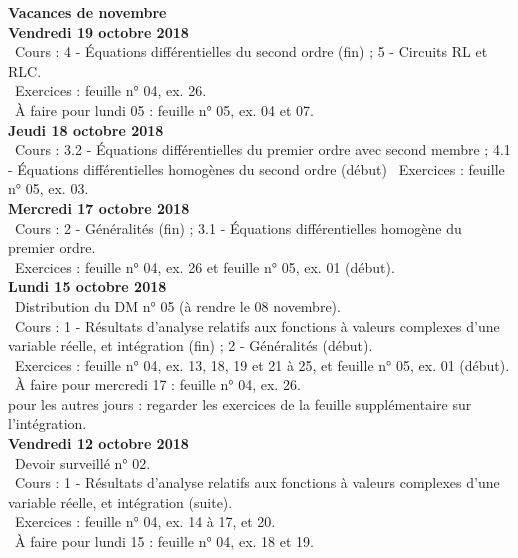 \documentclass[12pt,a4paper]{article}
\begin{document}
\noindent\textbf{ Vacances de novembre }\vspace{.4cm}\\

\noindent\textbf{Vendredi 19 octobre 2018}\\
\bu\ Cours : 4 - Équations différentielles du second ordre (fin) ; 5 - Circuits RL et RLC.\\
\bu\ Exercices : feuille n° 04, ex. 26.\\
\bu\ À faire pour lundi 05 : feuille n° 05, ex. 04 et 07.\vspace{.4cm}\\

\noindent\textbf{Jeudi 18 octobre 2018}\\
\bu\ Cours : 3.2 - Équations différentielles du premier ordre avec second membre ; 4.1 - Équations 
différentielles homogènes du second ordre (début)
\bu\ Exercices : feuille n° 05, ex. 03.\vspace{.4cm}\\
 
\noindent\textbf{\bf Mercredi 17 octobre 2018}\\
\bu\ Cours : 2 - Généralités (fin) ; 3.1 - Équations différentielles homogène du premier ordre.\\
\bu\ Exercices : feuille n° 04, ex. 26 et feuille n° 05, ex. 01 (début).\vspace{.4cm}\\
 
\noindent\textbf{Lundi 15 octobre 2018}\\
\bu\ Distribution du DM n° 05 (à rendre le 08 novembre).\\
\bu\ Cours : 1 - Résultats d'analyse relatifs aux fonctions à valeurs complexes d'une variable réelle, et intégration 
(fin) ; 2 - Généralités (début).\\
\bu\ Exercices : feuille n° 04, ex. 13, 18, 19 et 21 à 25, et feuille n° 05, ex. 01 (début).\\
\bu\ À faire pour mercredi 17 : feuille n° 04, ex. 26.\\
\bu pour les autres jours : regarder les exercices de la feuille supplémentaire sur l'intégration.\vspace{.4cm}\\
 
\noindent\textbf{Vendredi 12 octobre 2018}\\
\bu\ Devoir surveillé n° 02.\\
\bu\ Cours : 1 - Résultats d'analyse relatifs aux fonctions à valeurs complexes d'une variable réelle, et intégration 
(suite).\\
\bu\ Exercices : feuille n° 04, ex. 14 à 17, et 20.\\
\bu\ À faire pour lundi 15 : feuille n° 04, ex. 18 et 19.\vspace{.4cm}\\
 
\end{document}
